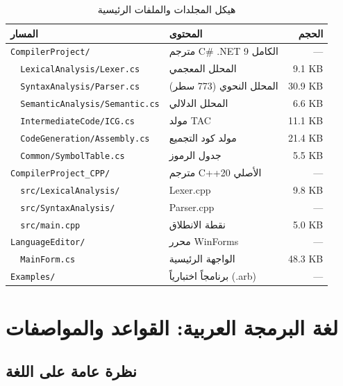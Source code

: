 \documentclass[12pt,a4paper]{report}
\begin{document}
\begin{table}[H]
\caption{\arabicfont هيكل المجلدات والملفات الرئيسية}
\label{tab:structure}
\centering
\small
\begin{tabular}{|l|l|r|}
\hline
\rowcolor{TableHead}
\textbf{\arabicfont المسار} & \textbf{\arabicfont المحتوى} & \textbf{\arabicfont الحجم} \\
\hline
\texttt{CompilerProject/} & \arabicfont مترجم C\# .NET 9 الكامل & — \\
\texttt{\ \ LexicalAnalysis/Lexer.cs} & \arabicfont المحلل المعجمي & 9.1 KB \\
\texttt{\ \ SyntaxAnalysis/Parser.cs} & \arabicfont المحلل النحوي (773 سطر) & 30.9 KB \\
\texttt{\ \ SemanticAnalysis/Semantic.cs} & \arabicfont المحلل الدلالي & 6.6 KB \\
\texttt{\ \ IntermediateCode/ICG.cs} & \arabicfont مولد TAC & 11.1 KB \\
\texttt{\ \ CodeGeneration/Assembly.cs} & \arabicfont مولد كود التجميع & 21.4 KB \\
\texttt{\ \ Common/SymbolTable.cs} & \arabicfont جدول الرموز & 5.5 KB \\
\hline
\rowcolor{TableAlt}
\texttt{CompilerProject\_CPP/} & \arabicfont مترجم C++20 الأصلي & — \\
\texttt{\ \ src/LexicalAnalysis/} & \arabicfont Lexer.cpp & 9.8 KB \\
\texttt{\ \ src/SyntaxAnalysis/} & \arabicfont Parser.cpp & — \\
\texttt{\ \ src/main.cpp} & \arabicfont نقطة الانطلاق & 5.0 KB \\
\hline
\texttt{LanguageEditor/} & \arabicfont محرر WinForms & — \\
\texttt{\ \ MainForm.cs} & \arabicfont الواجهة الرئيسية & 48.3 KB \\
\hline
\rowcolor{TableAlt}
\texttt{Examples/} & \arabicfont 12 برنامجاً اختبارياً (.arb) & — \\
\hline
\end{tabular}
\end{table}

\chapter{لغة البرمجة العربية: القواعد والمواصفات}

\section{نظرة عامة على اللغة}
\end{document}
